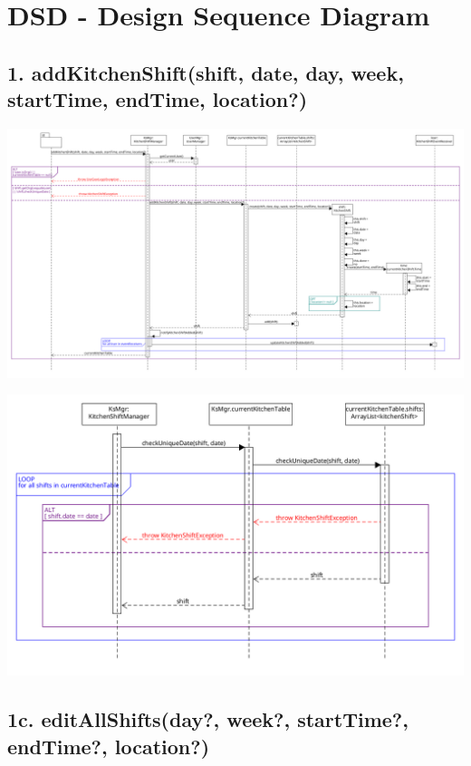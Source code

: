 \chapter{DSD - Design Sequence Diagram}

\section*{1. addKitchenShift(shift, date, day, week, startTime, endTime, location?)}

\begin{center}
  \includegraphics[scale = 0.2]{images/DSD/Esame DSD 1.png}
\end{center}

\begin{center}
  \includegraphics[scale = 0.4]{images/DSD/Esame DSD 1 Extra.png}  
\end{center}

\pagebreak

\section*{1c. editAllShifts(day?, week?, startTime?, endTime?, location?)}

